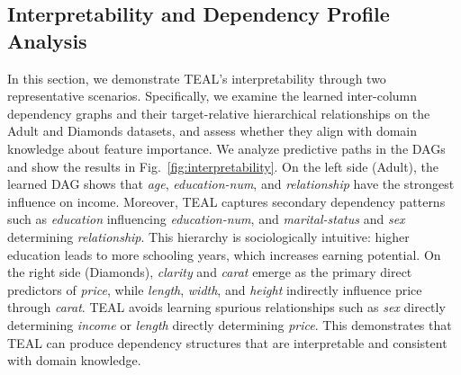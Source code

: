 \documentclass[conference]{IEEEtran}
\newcommand{\icde}[1]{{\color{black}#1}}
\newcommand{\rlend}[1]{{\color{black}#1}}
\newcommand{\syadd}[1]{{\color{black}#1}}
\newcommand{\zjic}[1]{{\color{black}#1}}
\newcommand{\syic}[1]{{\color{black}#1}}
\newcommand*{\ourmodel}{TEAL}
\begin{document}
\subsection{Interpretability \syic{and Dependency Profile Analysis}}
In this section, we demonstrate \ourmodel{}’s interpretability through two representative scenarios. 
\zjic{
Specifically, we examine the learned inter-column dependency graphs and their target-relative hierarchical relationships on the Adult and Diamonds datasets, and assess whether they align with domain knowledge about feature importance.
} 
We analyze predictive paths in the DAGs and show the results in Fig.~\ref{fig:interpretability}.
\rlend{
On the left side (Adult), the learned DAG shows that \textit{age}, \textit{education-num}, and \textit{relationship} have the strongest influence on income. Moreover, \ourmodel{} captures secondary \syic{dependency} patterns such as \textit{education} influencing \textit{education-num}, and \textit{marital-status} and \textit{sex} determining \textit{relationship}. 
This hierarchy is sociologically intuitive: higher education leads to more schooling years, which increases earning potential\cite{r:hout2012}.
On the right side (Diamonds), \textit{clarity} and \textit{carat} emerge as the primary direct \syic{predictors} of \textit{price}, while \textit{length}, \textit{width}, and \textit{height} indirectly influence price through \textit{carat}\cite{r:diamonds}. 
\ourmodel{} avoids learning spurious relationships such as \textit{sex} directly determining \textit{income} or \textit{length} directly determining \textit{price}.}
\syic{This demonstrates that \ourmodel{} can produce dependency structures that are interpretable and consistent with domain knowledge.}
\end{document}
